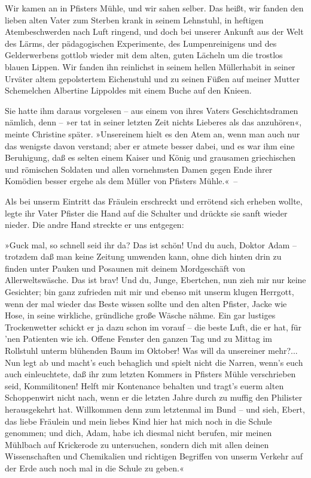 Wir kamen an in Pfisters Mühle, und wir sahen selber. Das heißt,
wir fanden den lieben alten Vater zum Sterben krank in seinem
Lehnstuhl, in heftigen Atembeschwerden nach Luft ringend, und doch
bei unserer Ankunft aus der Welt des Lärms, der pädagogischen
Experimente, des Lumpenreinigens und des Gelderwerbens gottlob
wieder mit dem alten, guten Lächeln um die trostlos blauen Lippen.
Wir fanden ihn reinlichst in seinem hellen Müllerhabit in seiner
Urväter altem gepolstertem Eichenstuhl und zu seinen Füßen auf
meiner Mutter Schemelchen Albertine Lippoldes mit einem Buche auf
den Knieen.

Sie hatte ihm daraus vorgelesen – aus einem von ihres Vaters
Geschichtsdramen nämlich, denn – »er tat in seiner letzten Zeit
nichts Lieberes als das anzuhören«, meinte Christine später.
»Unsereinem hielt es den Atem an, wenn man auch nur das wenigste
davon verstand; aber er atmete besser dabei, und es war ihm eine
Beruhigung, daß es selten einem Kaiser und König und grausamen
griechischen und römischen Soldaten und allen vornehmsten Damen
gegen Ende ihrer Komödien besser ergehe als dem Müller von Pfisters
Mühle.«~–

Als bei unserm Eintritt das Fräulein erschreckt und errötend sich
erheben wollte, legte ihr Vater Pfister die Hand auf die Schulter
und drückte sie sanft wieder nieder. Die andre Hand streckte er uns
entgegen:

»Guck mal, so schnell seid ihr da? Das ist schön! Und du auch,
Doktor Adam – trotzdem daß man keine Zeitung umwenden kann, ohne
dich hinten drin zu finden unter Pauken und Posaunen mit deinem
Mordgeschäft von Allerweltswäsche. Das ist brav! Und du, Junge,
Ebertchen, nun zieh mir nur keine Gesichter; bin ganz zufrieden mit
mir und ebenso mit unserm klugen Herrgott, wenn der mal wieder das
Beste wissen sollte und den alten Pfister, Jacke wie Hose, in seine
wirkliche, gründliche große Wäsche nähme. Ein gar lustiges
Trockenwetter schickt er ja dazu schon im vorauf – die beste Luft,
die er hat, für 'nen Patienten wie ich. Offene Fenster den ganzen
Tag und zu Mittag im Rollstuhl unterm blühenden Baum im Oktober!
Was will da unsereiner mehr?... Nun legt ab und macht's euch
behaglich und spielt nicht die Narren, wenn's euch auch
einleuchtete, daß ihr zum letzten Kommers in Pfisters Mühle
verschrieben seid, Kommilitonen! Helft mir Kontenance behalten und
tragt's euerm alten Schoppenwirt nicht nach, wenn er die letzten
Jahre durch zu muffig den Philister herausgekehrt hat. Willkommen
denn zum letztenmal im Bund – und sieh, Ebert, das liebe Fräulein
und mein liebes Kind hier hat mich noch in die Schule genommen; und
dich, Adam, habe ich diesmal nicht berufen, mir meinen Mühlbach auf
Krickerode zu untersuchen, sondern dich mit allen deinen
Wissenschaften und Chemikalien und richtigen Begriffen von unserm
Verkehr auf der Erde auch noch mal in die Schule zu geben.«

